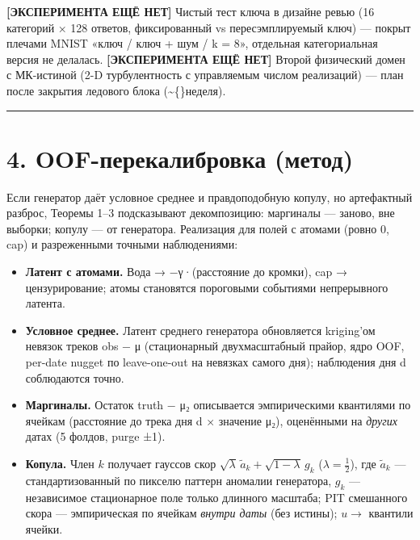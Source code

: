 \documentclass[11pt]{article}
\begin{document}
\textbf{[ЭКСПЕРИМЕНТА ЕЩЁ НЕТ]} Чистый тест ключа в дизайне ревью (16 категорий × 128 ответов, фиксированный vs пересэмплируемый ключ) — покрыт плечами MNIST «ключ / ключ + шум / k = 8», отдельная категориальная версия не делалась. \textbf{[ЭКСПЕРИМЕНТА ЕЩЁ НЕТ]} Второй физический домен с МК-истиной (2-D турбулентность с управляемым числом реализаций) — план после закрытия ледового блока (\textasciitilde\{\}неделя).

\bigskip\hrule\bigskip

\section*{4. OOF-перекалибровка (метод)}

Если генератор даёт условное среднее и правдоподобную копулу, но артефактный разброс, Теоремы 1–3 подсказывают декомпозицию: маргиналы — заново, вне выборки; копулу — от генератора. Реализация для полей с атомами (ровно 0, cap) и разреженными точными наблюдениями:

\begin{itemize}\item \textbf{Латент с атомами.} Вода {\symfont →} {\symfont −γ}·(расстояние до кромки), cap {\symfont →} цензурирование; атомы становятся пороговыми событиями непрерывного латента.\item \textbf{Условное среднее.} Латент среднего генератора обновляется kriging'ом невязок треков obs {\symfont −} {\symfont μ} (стационарный двухмасштабный прайор, ядро OOF, per-date nugget по leave-one-out на невязках самого дня); наблюдения дня d соблюдаются точно.\item \textbf{Маргиналы.} Остаток truth {\symfont −} {\symfont μ₂} описывается эмпирическими квантилями по ячейкам (расстояние до трека дня d × значение {\symfont μ₂}), оценёнными на \emph{других} датах (5 фолдов, purge ±1).\item \textbf{Копула.} Член $k$ получает гауссов скор $\sqrt{\lambda}\,\tilde a_k + \sqrt{1-\lambda}\,g_k$ ($\lambda = \tfrac12$), где $\tilde a_k$ — стандартизованный по пикселю паттерн аномалии генератора, $g_k$ — независимое стационарное поле только длинного масштаба; PIT смешанного скора — эмпирическая по ячейкам \emph{внутри даты} (без истины); $u \to$ квантили ячейки.\end{itemize}
\end{document}
